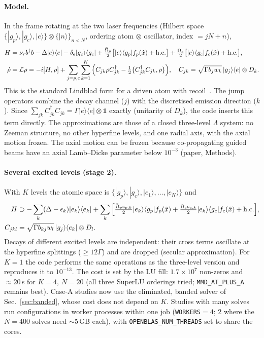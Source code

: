 \documentclass[11pt,a4paper]{article}
\newcommand{\ket}[1]{|#1\rangle}
\newcommand{\bra}[1]{\langle #1|}
\newcommand{\gp}{\ket{g_p}}
\newcommand{\gc}{\ket{g_c}}
\newcommand{\Om}{\Omega}
\newcommand{\code}[1]{\texttt{#1}}
\begin{document}
\paragraph{Model.} In the frame rotating at the two laser frequencies (Hilbert space $\{\gp,\gc,\ket e\}\otimes\{\ket n\}_{n<N}$, ordering atom $\otimes$ oscillator, index $= jN+n$),
\begin{align}
  H&=\nu_rb^\dagger b-\Delta\ket e\bra e-\delta_{\rm e}\ket{g_c}\bra{g_c}
   +\tfrac{\bar\Om_p}2\big[\ket e\bra{g_p}f_p(\hat x)+{\rm h.c.}\big]+\tfrac{\Om_c}2\big[\ket e\bra{g_c}f_c(\hat x)+{\rm h.c.}\big],\\
  \dot\rho&=\mathcal L\rho=-i[H,\rho]+\sum_{j=p,c}\sum_{k=1}^{K}\Big(C_{jk}\rho C_{jk}^\dagger-\tfrac12\{C_{jk}^\dagger C_{jk},\rho\}\Big),\quad
  C_{jk}=\sqrt{\Gamma b_jw_k}\,\ket{g_j}\bra e\otimes D_k .
\end{align}
This is the standard Lindblad form for a driven atom with recoil~\cite{cirac1992,breuer2007}. The jump operators combine the decay channel ($j$) with the discretised emission direction ($k$). Since $\sum_{jk}C^\dagger_{jk}C_{jk}=\Gamma\ket e\bra e\otimes\mathbb1$ exactly (unitarity of $D_k$), the code inserts this term directly. The approximations are those of a closed three-level $\Lambda$ system: no Zeeman structure, no other hyperfine levels, and one radial axis, with the axial motion frozen. The axial motion can be frozen because co-propagating guided beams have an axial Lamb--Dicke parameter below $10^{-3}$ (paper, Methods).

\paragraph{Several excited levels (stage 2).} With $K$ levels the atomic space is $\{\gp,\gc,\ket{e_1},\dots,\ket{e_K}\}$ and
\begin{align}
  H&\supset-\sum_k(\Delta-\epsilon_k)\ket{e_k}\bra{e_k}+\sum_k\Big[\tfrac{\bar\Om_pc_{p,k}}2\ket{e_k}\bra{g_p}f_p(\hat x)+\tfrac{\Om_cc_{c,k}}2\ket{e_k}\bra{g_c}f_c(\hat x)+{\rm h.c.}\Big],\\
  C_{jkl}&=\sqrt{\Gamma b_{kj}w_l}\,\ket{g_j}\bra{e_k}\otimes D_l .
\end{align}
Decays of different excited levels are independent: their cross terms oscillate at the hyperfine splittings ($\ge12\Gamma$) and are dropped (secular approximation). For $K=1$ the code performs the same operations as the three-level version and reproduces it to $10^{-13}$. The cost is set by the LU fill: $1.7\times10^7$ non-zeros and $\approx20$\,s for $K=4$, $N=20$ (all three SuperLU orderings tried; \code{MMD\_AT\_PLUS\_A} remains best). Case-A studies now use the eliminated, banded solver of Sec.~\ref{sec:banded}, whose cost does not depend on $K$. Studies with many solves run configurations in worker processes within one job (\code{WORKERS}$=4$; 2 where the $N=400$ solves need $\sim5$\,GB each), with \code{OPENBLAS\_NUM\_THREADS} set to share the cores.
\end{document}

